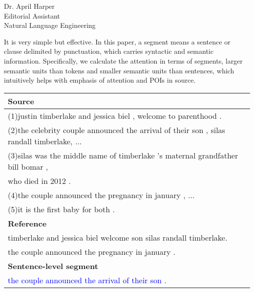\documentclass[11pt]{letter} %
\theoremstyle{definition}
\begin{document}
\begin{letter}{Dr. April Harper \\
            Editorial Assistant \\
			Natural Language Engineering}
\begin{enumerate}
\begin{itemize}
                It is very simple but effective. 
                In this paper, a segment means 
                a sentence or clause delimited by punctuation,
                which carries syntactic and semantic information. 
                Specifically, we calculate the attention in terms of segments, 
                larger semantic units than tokens and smaller semantic units than sentences, 
                which intuitively helps with emphasis of attention and POIs in source.
                \begin{center}
                	\begin{tabular}{|l|}%
                		\hline 
                		\textbf{Source} \\
                		\hline 
                		(1)justin timberlake and jessica biel , welcome to parenthood . \\
                		(2)the celebrity couple announced the arrival of their son , silas randall timberlake, ... \\
                		(3)silas was the middle name of timberlake ’s maternal grandfather bill bomar , \\
                		who died in 2012 .\\
                		(4)the couple announced the pregnancy in january , ... \\
                		(5)it is the first baby for both .  \\
                		\hline 
                		\textbf{Reference} \\
                		\hline 
                		timberlake and jessica biel welcome son silas randall timberlake. \\
                		the couple announced the pregnancy in january . \\
                		\hline 
                		\textbf{Sentence-level segment} \\
                		\hline \textcolor{blue}{the couple announced the arrival of their son .} \\

\end{tabular}
\end{center}
\end{itemize}
\end{enumerate}
\end{letter}
\end{document}
